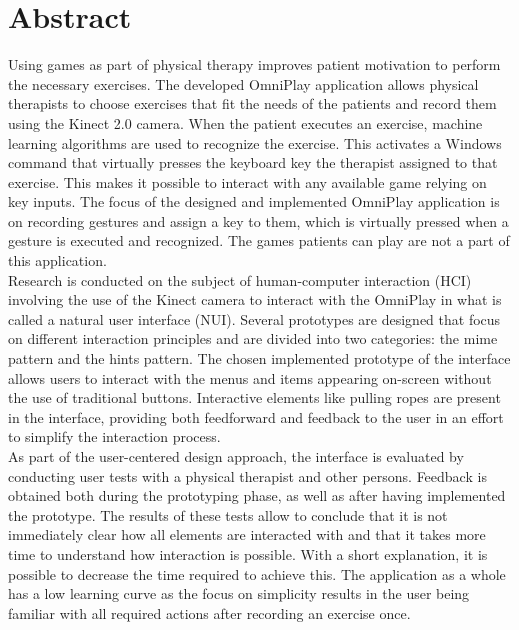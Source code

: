 \chapter*{Abstract}

Using games as part of physical therapy improves patient motivation to perform the necessary exercises. The developed OmniPlay application allows physical therapists to choose exercises that fit the needs of the patients and record them using the Kinect 2.0 camera. When the patient executes an exercise, machine learning algorithms are used to recognize the exercise. This activates a Windows command that virtually presses the keyboard key the therapist assigned to that exercise. This makes it possible to interact with any available game relying on key inputs. The focus of the designed and implemented OmniPlay application is on recording gestures and assign a key to them, which is virtually pressed when a gesture is executed and recognized. The games patients can play are not a part of this application.\\

Research is conducted on the subject of human-computer interaction (HCI) involving the use of the Kinect camera to interact with the OmniPlay in what is called a natural user interface (NUI). Several prototypes are designed that focus on different interaction principles and are divided into two categories: the mime pattern and the hints pattern. The chosen implemented prototype of the interface allows users to interact with the menus and items appearing on-screen without the use of traditional buttons. Interactive elements like pulling ropes are present in the interface, providing both feedforward and feedback to the user in an effort to simplify the interaction process.\\

As part of the user-centered design approach, the interface is evaluated by conducting user tests with a physical therapist and other persons. Feedback is obtained both during the prototyping phase, as well as after having implemented the prototype. The results of these tests allow to conclude that it is not immediately clear how all elements are interacted with and that it takes more time to understand how interaction is possible. With a short explanation, it is possible to decrease the time required to achieve this. The application as a whole has a low learning curve as the focus on simplicity results in the user being familiar with all required actions after recording an exercise once.\\

